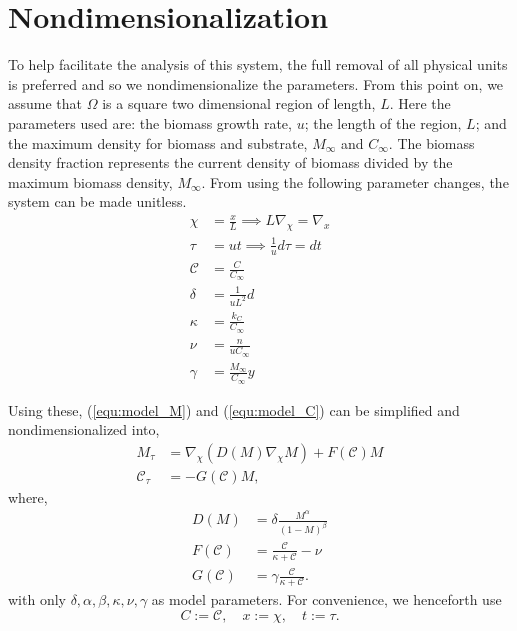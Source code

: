 \section{Nondimensionalization}
 
To help facilitate the analysis of this system, the full removal of all physical units is preferred and so we nondimensionalize the parameters.
From this point on, we assume that $\Omega$ is a square two dimensional region of length, $L$. 
Here the parameters used are: the biomass growth rate, $u$; the length of the region, $L$; and the maximum density for biomass and substrate, $M_\infty$ and $C_\infty$.
The biomass density fraction represents the current density of biomass divided by the maximum biomass density, $M_{\infty}$.
From using the following parameter changes, the system can be made unitless.
\begin{align}
  \chi &= \frac{x}{L} \implies L \nabla_\chi= \nabla_x \\
  \tau &= u t \implies \frac{1}{u} d\tau= dt \\
  \mathcal{C} &= \frac{C}{C_{\infty}} \\
  \delta &= \frac{1}{u L^2} d \\
  \kappa &= \frac{k_C}{C_\infty} \\
  \nu &= \frac{n}{u C_\infty} \\
  \gamma &= \frac{M_\infty}{C_\infty} y
\end{align}

Using these, (\ref{equ:model_M}) and (\ref{equ:model_C}) can be simplified and nondimensionalized into, 
\begin{align} \label{equ:model_system}
  M_\tau &= \nabla_\chi \left( D(M) \nabla_\chi M \right) + F(\mathcal{C}) M \\
  \mathcal{C}_\tau &= - G(\mathcal{C}) M, 
\end{align}
where,
\begin{equation}
\begin{aligned} \label{equ:model_functions}
  D(M) &= \delta \frac{M^\alpha}{(1 - M)^\beta} \\
  F(\mathcal{C}) &= \frac{ \mathcal{C}} {\kappa + \mathcal{C}} - \nu \\
  G(\mathcal{C}) &= \gamma \frac{\mathcal{C}}{\kappa +\mathcal{C}}.
\end{aligned}
\end{equation}
with only $\delta, \alpha, \beta, \kappa, \nu, \gamma$ as model parameters. 
For convenience, we henceforth use
\begin{equation}
  C := \mathcal{C},\quad x := \chi,\quad t := \tau.
\end{equation}

